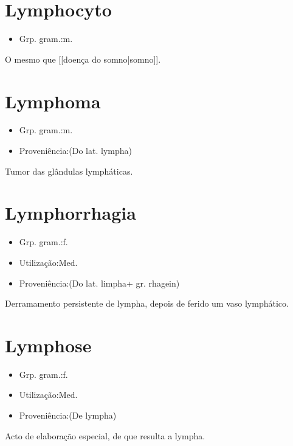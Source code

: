 \section{Lymphocyto}
\begin{itemize}
\item {Grp. gram.:m.}
\end{itemize}
O mesmo que [[doença do somno|somno]].
\section{Lymphoma}
\begin{itemize}
\item {Grp. gram.:m.}
\end{itemize}
\begin{itemize}
\item {Proveniência:(Do lat. \textunderscore lympha\textunderscore )}
\end{itemize}
Tumor das glândulas lympháticas.
\section{Lymphorrhagia}
\begin{itemize}
\item {Grp. gram.:f.}
\end{itemize}
\begin{itemize}
\item {Utilização:Med.}
\end{itemize}
\begin{itemize}
\item {Proveniência:(Do lat. \textunderscore limpha\textunderscore  + gr. \textunderscore rhagein\textunderscore )}
\end{itemize}
Derramamento persistente de lympha, depois de ferido um vaso lymphático.
\section{Lymphose}
\begin{itemize}
\item {Grp. gram.:f.}
\end{itemize}
\begin{itemize}
\item {Utilização:Med.}
\end{itemize}
\begin{itemize}
\item {Proveniência:(De \textunderscore lympha\textunderscore )}
\end{itemize}
Acto de elaboração especial, de que resulta a lympha.
